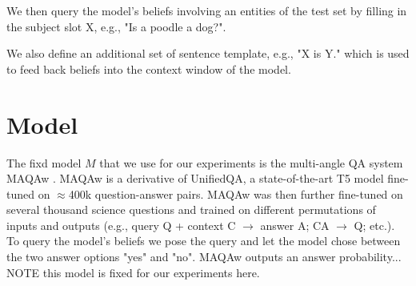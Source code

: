 \documentclass[11pt]{article}
\newcommand{\eat}[1]{}
\newcommand{\red}[1]{\textcolor{red}{#1}}
\begin{document}
We then query the model's beliefs involving an entities of the test set by filling in the subject slot X, e.g., "Is a poodle a dog?".

We also define an additional set of sentence template, e.g., "X is Y." which is used to feed back beliefs into the context window of the model.



\eat{\subsection{Templates}

We collect all the unique variabilized sentences in the constraints together,
resulting in 200 \red{??} sentence templates, e.g., ``?X is a dog.''.
}


\section{Model}

The fixd model $M$ that we use for our experiments is the multi-angle QA system MAQAw \cite{arc-da}.
MAQAw is a derivative of UnifiedQA, a state-of-the-art T5 model fine-tuned on $\approx$400k question-answer pairs.
MAQAw was then 
further fine-tuned on several thousand science questions and trained on different permutations of inputs and outputs
(e.g., query Q + context C $\rightarrow$ answer A; CA $\rightarrow$ Q; etc.). 
To query the model's beliefs we pose the query and let the model chose between the two answer options "yes" and "no".
MAQAw outputs an answer probability...
NOTE this model is fixed for our experiments here.
\end{document}
